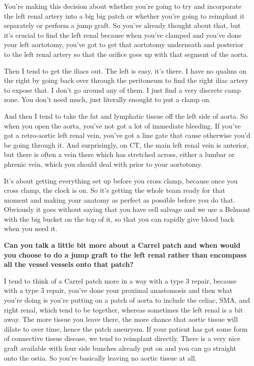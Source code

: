 \documentclass[
]{book}
\begin{document}
You're making this decision about whether you're going to try and
incorporate the left renal artery into a big big patch or whether you're
going to reimplant it separately or perform a jump graft. So you've
already thought about that, but it's crucial to find the left renal
because when you've clamped and you've done your left aortotomy, you've
got to get that aortotomy underneath and posterior to the left renal
artery so that the orifice goes up with that segment of the aorta.

Then I tend to get the iliacs out. The left is easy, it's there. I have
no qualms on the right by going back over through the peritoneum to find
the right iliac artery to expose that. I don't go around any of them. I
just find a very discrete camp zone. You don't need much, just literally
enought to put a clamp on.

And then I tend to take the fat and lymphatic tissue off the left side
of aorta. So when you open the aorta, you've not got a lot of immediate
bleeding. If you've got a retro-aortic left renal vein, you've got a
line gate that cause otherwise you'd be going through it. And
surprisingly, on CT, the main left renal vein is anterior, but there is
often a vein there which has stretched across, either a lumbar or
phrenic vein, which you should deal with prior to your aortotomy.

It's about getting everything set up before you cross clamp, because
once you cross clamp, the clock is on. So it's getting the whole team
ready for that moment and making your anatomy as perfect as possible
before you do that. Obviously it goes without saying that you have cell
salvage and we use a Belmont with the big bucket on the top of it, so
that you can rapidly give blood back when you need it.

\textbf{Can you talk a little bit more about a Carrel patch and when would you
choose to do a jump graft to the left renal rather than encompass all
the vessel vessels onto that patch?}

I tend to think of a Carrel patch more in a way with a type 3 repair,
because with a type 3 repair, you've done your proximal anastomosis and
then what you're doing is you're putting on a patch of aorta to include
the celiac, SMA, and right renal, which tend to be together, whereas
sometimes the left renal is a bit away. The more tissue you leave there,
the more chance that aortic tissue will dilate to over time, hence the
patch aneurysm. If your patient has got some form of connective tissue
disease, we tend to reimplant directly.\citep{derango2011, afifi2017} There
is a very nice graft available with four side bunches already put on and
you can go straight onto the ostia. So you're basically leaving no
aortic tissue at all.
\end{document}
